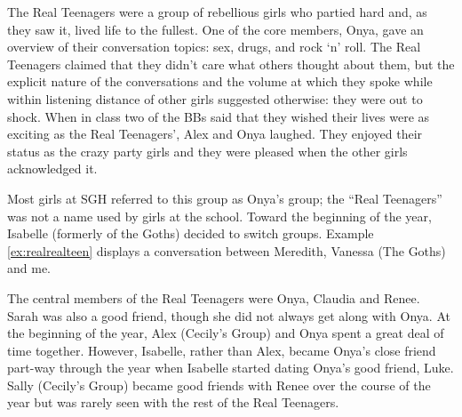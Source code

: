 \nocite{geertz1973}

The Real Teenagers were a group of rebellious girls who partied hard and, as they saw it, lived life to the fullest.  One of the core members, Onya, gave an overview of their conversation topics: sex, drugs, and rock `n' roll.  The Real Teenagers claimed that they didn't care what others thought about them, but the explicit nature of the conversations and the volume at which they spoke while within listening distance of other girls suggested otherwise: they were out to shock.  When in class two of the BBs said that they wished their lives were as exciting as the Real Teenagers', Alex and Onya laughed.  They enjoyed their status as the crazy party girls and they were pleased when the other girls acknowledged it.

Most girls at SGH referred to this group as Onya's group; the ``Real Teenagers'' was not a name used by girls at the school.  Toward the beginning of the year, Isabelle (formerly of the Goths) decided to switch groups.  Example \ref{ex:realrealteen} displays a conversation between Meredith, Vanessa (The Goths) and me.  

\label{ex:realrealteen}

\vspace{5 mm}

\noindent The central members of the Real Teenagers were Onya, Claudia and Renee.  Sarah was also a good friend, though she did not always get along with Onya.  At the beginning of the year, Alex (Cecily's Group) and Onya spent a great deal of time together.  However, Isabelle, rather than Alex, became Onya's close friend part-way through the year when Isabelle started dating Onya's good friend, Luke.  Sally (Cecily's Group) became good friends with Renee over the course of the year but was rarely seen with the rest of the Real Teenagers.

